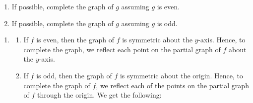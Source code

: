 \documentclass{ximera}
\begin{document}
\begin{example}
\begin{enumerate}
\begin{image}
\end{image}

\begin{enumerate}

\item  If possible, complete the graph of $g$ assuming $g$ is even.

\item  If possible, complete the graph of $g$ assuming $g$ is odd.


\end{enumerate}

\end{enumerate}

\begin{explanation}

\begin{enumerate}
\item \begin{enumerate} \item  If $f$ is even, then the graph of $f$ is symmetric about the $y$-axis.  Hence, to complete the graph, we reflect each point on the partial graph of $f$ about the $y$-axis.

\begin{image}
% 

\end{image}

 
\item  If $f$ is odd,  then the graph of $f$ is symmetric about the origin.  Hence, to complete the graph of $f$,  we reflect each of the points on the partial graph of $f$ through the origin. We get the following:   


\begin{image}
% 


\end{image}
\end{enumerate}
\end{enumerate}
\end{explanation}
\end{example}
\end{document}
